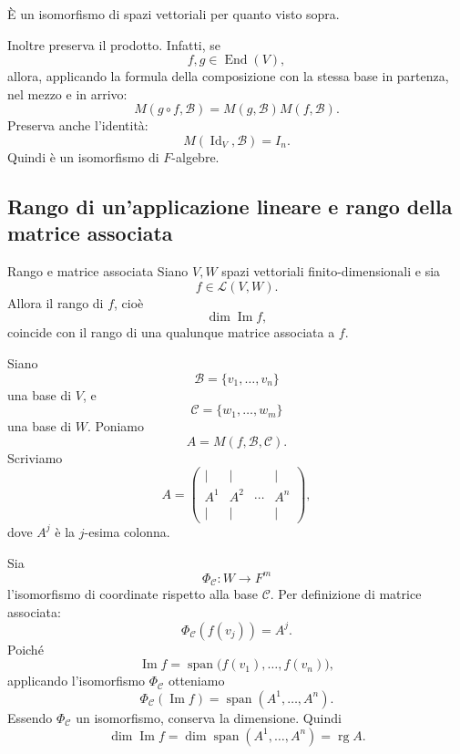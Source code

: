 \documentclass[a4paper]{article}
\begin{document}
\begin{snippetproof}{}
    È un isomorfismo di spazi vettoriali per quanto visto sopra.

    Inoltre preserva il prodotto. Infatti, se
    \[
        f,g\in\operatorname{End}(V),
    \]
    allora, applicando la formula della composizione con la stessa base in partenza, nel mezzo e in arrivo:
    \[
        M(g\circ f,\mathcal{B})
        =
        M(g,\mathcal{B})M(f,\mathcal{B}).
    \]
    Preserva anche l'identità:
    \[
        M(\operatorname{Id}_V,\mathcal{B})=I_n.
    \]
    Quindi è un isomorfismo di \(F\)-algebre.
\end{snippetproof}

\subsection{Rango di un'applicazione lineare e rango della matrice associata}

\begin{snippettheorem}{Rango e matrice associata}
    Siano \(V,W\) spazi vettoriali finito-dimensionali e sia
    \[
        f\in\mathcal{L}(V,W).
    \]
    Allora il rango di \(f\), cioè
    \[
        \dim\operatorname{Im}f,
    \]
    coincide con il rango di una qualunque matrice associata a \(f\).
\end{snippettheorem}

\begin{snippetproof}{}
    Siano
    \[
        \mathcal{B}=\{v_1,\ldots,v_n\}
    \]
    una base di \(V\), e
    \[
        \mathcal{C}=\{w_1,\ldots,w_m\}
    \]
    una base di \(W\). Poniamo
    \[
        A=M(f,\mathcal{B},\mathcal{C}).
    \]
    Scriviamo
    \[
        A=
        \begin{pmatrix}
            \vert & \vert & & \vert\\
            A^1 & A^2 & \cdots & A^n\\
            \vert & \vert & & \vert
        \end{pmatrix},
    \]
    dove \(A^j\) è la \(j\)-esima colonna.

    Sia
    \[
        \Phi_{\mathcal{C}}:W\to F^m
    \]
    l'isomorfismo di coordinate rispetto alla base \(\mathcal{C}\). Per definizione di matrice associata:
    \[
        \Phi_{\mathcal{C}}(f(v_j))=A^j.
    \]
    Poiché
    \[
        \operatorname{Im}f
        =
        \operatorname{span}\bigl(f(v_1),\ldots,f(v_n)\bigr),
    \]
    applicando l'isomorfismo \(\Phi_{\mathcal{C}}\) otteniamo
    \[
        \Phi_{\mathcal{C}}(\operatorname{Im}f)
        =
        \operatorname{span}(A^1,\ldots,A^n).
    \]
    Essendo \(\Phi_{\mathcal{C}}\) un isomorfismo, conserva la dimensione. Quindi
    \[
        \dim\operatorname{Im}f
        =
        \dim\operatorname{span}(A^1,\ldots,A^n)
        =
        \operatorname{rg}A.
    \]
\end{snippetproof}
\end{document}
